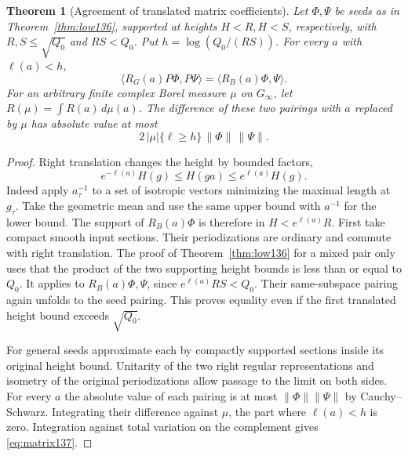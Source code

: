 \documentclass[a4paper,11pt]{article}
\newtheorem{theorem}[proposition]{Theorem}
\theoremstyle{definition}
\theoremstyle{remark}
\numberwithin{equation}{section}
\begin{document}
\begin{theorem}[Agreement of translated matrix coefficients]
\label{thm:matrix137}
Let \(\Phi,\Psi\) be seeds as in Theorem~\ref{thm:low136},
supported at heights \(H<R,H<S\), respectively, with
\(R,S\le\sqrt{Q_0}\) and \(RS<Q_0\). Put \(h=\log(Q_0/(RS))\).
For every \(a\) with \(\ell(a)<h\),
\[
     \langle R_G(a)P\Phi,P\Psi\rangle
                       =\langle R_B(a)\Phi,\Psi\rangle .
\]
For an arbitrary finite complex Borel measure \(\mu\) on
\(G_\infty\), let \(R(\mu)=\int R(a)\,d\mu(a)\).
The difference of these two pairings with \(a\) replaced by
\(\mu\) has absolute value at most
\begin{equation}
     2\,|\mu|\{\ell\ge h\}\,\|\Phi\|\,\|\Psi\|.
     \label{eq:matrix137}
\end{equation}
\end{theorem}
\begin{proof}
Right translation changes the height by bounded factors,
\[
          e^{-\ell(a)}H(g)\le H(ga)\le e^{\ell(a)}H(g).
\]
Indeed apply \(a_\tau^{-1}\) to a set of isotropic vectors
minimizing the maximal length at \(g_\tau\). Take the geometric
mean and use the same upper bound with \(a^{-1}\) for the lower
bound. The support of \(R_B(a)\Phi\) is therefore in
\(H<e^{\ell(a)}R\). First take compact smooth input sections.
Their periodizations are ordinary and commute with right
translation. The proof of Theorem~\ref{thm:low136} for a mixed
pair only uses that the product of the two supporting height
bounds is less than or equal to \(Q_0\). It applies to
\(R_B(a)\Phi,\Psi\), since \(e^{\ell(a)}RS<Q_0\).
Their same-subspace pairing again unfolds to the seed pairing.
This proves equality even if the first translated height bound
exceeds \(\sqrt{Q_0}\).

For general seeds approximate each by compactly supported
sections inside its original height bound. Unitarity of the
two right regular representations and isometry of the original
periodizations allow passage to the limit on both sides.
For every \(a\) the absolute value of each pairing is at most
\(\|\Phi\|\|\Psi\|\) by Cauchy--Schwarz. Integrating their
difference against \(\mu\), the part where \(\ell(a)<h\) is zero.
Integration against total variation on the complement gives
\eqref{eq:matrix137}.
\end{proof}
\end{document}
